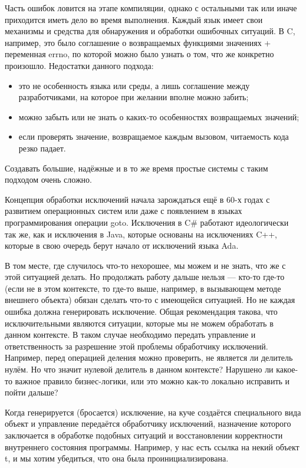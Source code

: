 \documentclass{../../text-style}
\begin{document}
Часть ошибок ловится на этапе компиляции, однако с остальными так или иначе приходится иметь дело во время выполнения. Каждый язык имеет свои механизмы и средства для обнаружения и обработки ошибочных ситуаций. В C, например, это было соглашение о возвращаемых функциями значениях + переменная errno, по которой можно было узнать о том, что же конкретно произошло. Недостатки данного подхода:

\begin{itemize}
    \item это не особенность языка или среды, а лишь соглашение между разработчиками, на которое при желании вполне можно забить;
    \item можно забыть или не знать о каких-то особенностях возвращаемых значений;
    \item если проверять значение, возвращаемое каждым вызовом, читаемость кода резко падает.
\end{itemize}

Создавать большие, надёжные и в то же время простые системы с таким подходом очень сложно.

Концепция обработки исключений начала зарождаться ещё в 60-х годах с развитием операционных систем или даже с появлением в языках программирования операции goto. Исключения в C\# работают идеологически так же, как и исключения в Java, которые основаны на исключениях C++, которые в свою очередь берут начало от исключений языка Ada.

В том месте, где случилось что-то нехорошее, мы можем и не знать, что же с этой ситуацией делать. Но продолжать работу дальше нельзя --- кто-то где-то (если не в этом контексте, то где-то выше, например, в вызывающем методе внешнего объекта) обязан сделать что-то с имеющейся ситуацией. Но не каждая ошибка должна генерировать исключение. Общая рекомендация такова, что исключительными являются ситуации, которые мы не можем обработать в данном контексте. В таком случае необходимо передать управление и ответственность за разрешение этой проблемы обработчику исключений. Например, перед операцией деления можно проверить, не является ли делитель нулём. Но что значит нулевой делитель в данном контексте? Нарушено ли какое-то важное правило бизнес-логики, или это можно как-то локально исправить и пойти дальше?

Когда генерируется (бросается) исключение, на куче создаётся специального вида объект и управление передаётся обработчику исключений, назначение которого заключается в обработке подобных ситуаций и восстановлении корректности внутреннего состояния программы. Например, у нас есть ссылка на некий объект t, и мы хотим убедиться, что она была проинициализирована.
\end{document}
